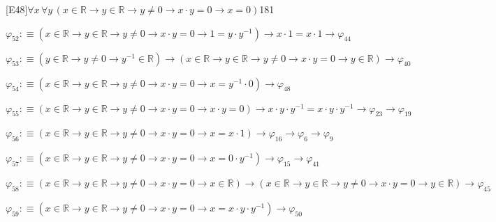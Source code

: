 \begin{fullproof}{[E48]}{$\forall x\,\forall y\,(x \in \mathbb{R} \to y \in \mathbb{R} \to y \neq 0 \to x \cdot y = 0 \to x = 0)$}{181}
\begin{abbrevlist}
\item $\varphi_{52} :\equiv (x \in \mathbb{R} \to y \in \mathbb{R} \to y \neq 0 \to x \cdot y = 0 \to 1 = y \cdot y^{-1}) \to x \cdot 1 = x \cdot 1 \to \varphi_{44}$
\item $\varphi_{53} :\equiv (y \in \mathbb{R} \to y \neq 0 \to y^{-1} \in \mathbb{R}) \to (x \in \mathbb{R} \to y \in \mathbb{R} \to y \neq 0 \to x \cdot y = 0 \to y \in \mathbb{R}) \to \varphi_{40}$
\item $\varphi_{54} :\equiv (x \in \mathbb{R} \to y \in \mathbb{R} \to y \neq 0 \to x \cdot y = 0 \to x = y^{-1} \cdot 0) \to \varphi_{48}$
\item $\varphi_{55} :\equiv (x \in \mathbb{R} \to y \in \mathbb{R} \to y \neq 0 \to x \cdot y = 0 \to x \cdot y = 0) \to x \cdot y \cdot y^{-1} = x \cdot y \cdot y^{-1} \to \varphi_{23} \to \varphi_{19}$
\item $\varphi_{56} :\equiv (x \in \mathbb{R} \to y \in \mathbb{R} \to y \neq 0 \to x \cdot y = 0 \to x = x \cdot 1) \to \varphi_{16} \to \varphi_{6} \to \varphi_{9}$
\item $\varphi_{57} :\equiv (x \in \mathbb{R} \to y \in \mathbb{R} \to y \neq 0 \to x \cdot y = 0 \to x = 0 \cdot y^{-1}) \to \varphi_{15} \to \varphi_{41}$
\item $\varphi_{58} :\equiv (x \in \mathbb{R} \to y \in \mathbb{R} \to y \neq 0 \to x \cdot y = 0 \to x \in \mathbb{R}) \to (x \in \mathbb{R} \to y \in \mathbb{R} \to y \neq 0 \to x \cdot y = 0 \to y \in \mathbb{R}) \to \varphi_{45}$
\item $\varphi_{59} :\equiv (x \in \mathbb{R} \to y \in \mathbb{R} \to y \neq 0 \to x \cdot y = 0 \to x = x \cdot y \cdot y^{-1}) \to \varphi_{50}$
\end{abbrevlist}
\end{fullproof}
